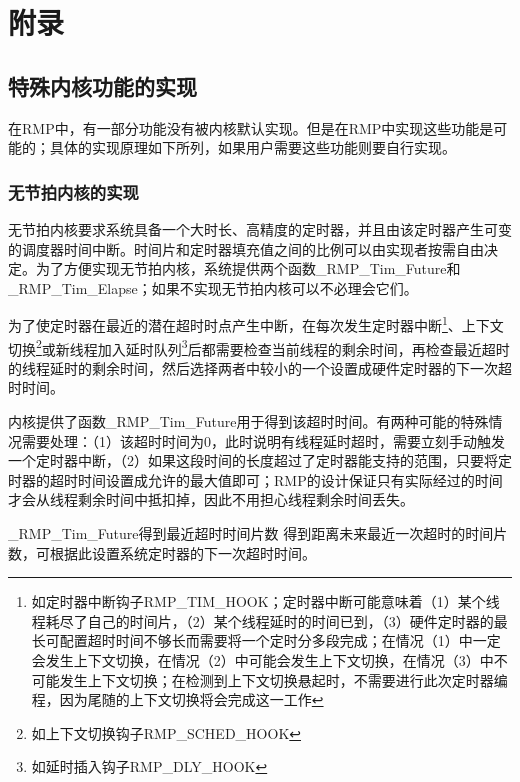 \chapter{附录}\label{ch:appendix}

\section{特殊内核功能的实现}\label{sec:implementation-of-special-kernel-features}

在RMP中，有一部分功能没有被内核默认实现。但是在RMP中实现这些功能是可能的；具体的实现原理如下所列，如果用户需要这些功能则要自行实现。

\subsection{无节拍内核的实现}\label{subsec:implementation-of-a-tickless-kernel}

\protect{}\label{subsec:implementation-of-a-tickless-kernel-2}无节拍内核要求系统具备一个大时长、高精度的定时器，并且由该定时器产生可变的调度器时间中断。时间片和定时器填充值之间的比例可以由实现者按需自由决定。为了方便实现无节拍内核，系统提供两个函数\_RMP\_Tim\_Future和\_RMP\_Tim\_Elapse；如果不实现无节拍内核可以不必理会它们。

为了使定时器在最近的潜在超时时点产生中断，在每次发生定时器中断\footnote{如定时器中断钩子RMP\_TIM\_HOOK；定时器中断可能意味着（1）某个线程耗尽了自己的时间片，（2）某个线程延时的时间已到，（3）硬件定时器的最长可配置超时时间不够长而需要将一个定时分多段完成；在情况（1）中一定会发生上下文切换，在情况（2）中可能会发生上下文切换，在情况（3）中不可能发生上下文切换；在检测到上下文切换悬起时，不需要进行此次定时器编程，因为尾随的上下文切换将会完成这一工作}、上下文切换\footnote{如上下文切换钩子RMP\_SCHED\_HOOK}或新线程加入延时队列\footnote{如延时插入钩子RMP\_DLY\_HOOK}后都需要检查当前线程的剩余时间，再检查最近超时的线程延时的剩余时间，然后选择两者中较小的一个设置成硬件定时器的下一次超时时间。

内核提供了函数\_RMP\_Tim\_Future用于得到该超时时间。有两种可能的特殊情况需要处理：（1）该超时时间为0，此时说明有线程延时超时，需要立刻手动触发一个定时器中断，（2）如果这段时间的长度超过了定时器能支持的范围，只要将定时器的超时时间设置成允许的最大值即可；RMP的设计保证只有实际经过的时间才会从线程剩余时间中抵扣掉，因此不用担心线程剩余时间丢失。

\begin{apidesc}{\_RMP\_Tim\_Future}{得到最近超时时间片数}
    得到距离未来最近一次超时的时间片数，可根据此设置系统定时器的下一次超时时间。
    \begin{apiparams}
    \end{apiparams}
    \begin{apiret}
    \end{apiret}
\end{apidesc}

